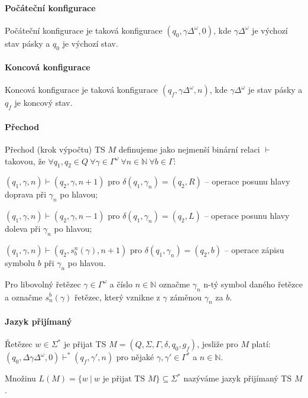 \paragraph*{Počáteční konfigurace} Počáteční konfigurace je taková konfigurace $(q_0, \gamma \Delta^{\omega}, 0)$, kde $\gamma \Delta^{\omega}$ je výchozí stav pásky a $q_0$ je výchozí stav.

\paragraph*{Koncová konfigurace} Koncová konfigurace je taková konfigurace $(q_f, \gamma \Delta^{\omega}, n)$, kde $\gamma \Delta^{\omega}$ je stav pásky a $q_f$ je koncový stav.

\paragraph*{Přechod} Přechod (krok výpočtu) TS $M$ definujeme jako nejmenší binární relaci $\vdash$ takovou, že $\forall q_1, q_2 \in Q ~ \forall \gamma \in \Gamma^{\omega} ~ \forall n \in \mathbb{N} ~ \forall b \in \Gamma$: \begin{compactitem}
    \item $(q_1, \gamma, n) \vdash (q_2, \gamma, n + 1)$ pro $\delta(q_1, \gamma_n) = (q_2, R)$ -- operace posunu hlavy doprava při $\gamma_n$ po hlavou;

    \item $(q_1, \gamma, n) \vdash (q_2, \gamma, n - 1)$ pro $\delta(q_1, \gamma_n) = (q_2, L)$ -- operace posunu hlavy doleva při $\gamma_n$ po hlavou;

    \item $(q_1, \gamma, n) \vdash (q_2, s_b^n(\gamma), n + 1)$ pro $\delta(q_1, \gamma_n) = (q_2, b)$ -- operace zápisu symbolu $b$ při $\gamma_n$ po hlavou.
\end{compactitem}

Pro libovolný řetězec $\gamma \in \Gamma^{\omega}$ a číslo $n \in \mathbb{N}$ označme $\gamma_n$ n-tý symbol daného řetězce a označme $s_n^b(\gamma)$ řetězec, který vznikne z $\gamma$ záměnou $\gamma_n$ za $b$.

\paragraph*{Jazyk přijímaný} \begin{compactitem}
    \item Řetězec $w \in \Sigma^*$ je přijat TS $M = (Q, \Sigma, \Gamma, \delta, q_0, g_f)$, jesliže pro $M$ platí:\break $(q_0, \Delta \gamma \Delta^{\omega}, 0) \vdash^* (q_f, \gamma', n)$ pro nějaké $\gamma, \gamma' \in \Gamma^*$ a $n \in \mathbb{N}$.

    \item Množinu $L(M) = \{ w ~|~ w \text{ je přijat TS } M \} \subseteq \Sigma^*$ nazýváme jazyk přijímaný TS $M$.
\end{compactitem}

